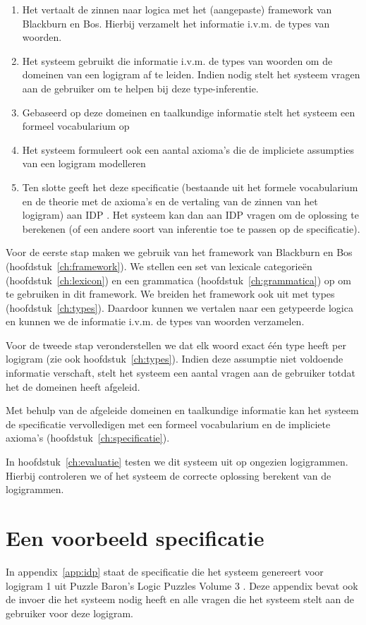 \begin{enumerate}
  \item Het vertaalt de zinnen naar logica met het (aangepaste) framework van Blackburn en Bos. Hierbij verzamelt het informatie i.v.m. de types van woorden.
  \item Het systeem gebruikt die informatie i.v.m. de types van woorden om de domeinen van een logigram af te leiden. Indien nodig stelt het systeem vragen aan de gebruiker om te helpen bij deze type-inferentie.
  \item Gebaseerd op deze domeinen en taalkundige informatie stelt het systeem een formeel vocabularium op
  \item Het systeem formuleert ook een aantal axioma's die de impliciete assumpties van een logigram modelleren
  \item Ten slotte geeft het deze specificatie (bestaande uit het formele vocabularium en de theorie met de axioma's en de vertaling van de zinnen van het logigram) aan IDP \cite{IDP}. Het systeem kan dan aan IDP vragen om de oplossing te berekenen (of een andere soort van inferentie toe te passen op de specificatie).
\end{enumerate}

Voor de eerste stap maken we gebruik van het framework van Blackburn en Bos (hoofdstuk~\ref{ch:framework}). We stellen een set van lexicale categorieën (hoofdstuk~\ref{ch:lexicon}) en een grammatica (hoofdstuk~\ref{ch:grammatica}) op om te gebruiken in dit framework. We breiden het framework ook uit met types (hoofdstuk~\ref{ch:types}). Daardoor kunnen we vertalen naar een getypeerde logica en kunnen we de informatie i.v.m. de types van woorden verzamelen.

Voor de tweede stap veronderstellen we dat elk woord exact één type heeft per logigram (zie ook hoofdstuk~\ref{ch:types}). Indien deze assumptie niet voldoende informatie verschaft, stelt het systeem een aantal vragen aan de gebruiker totdat het de domeinen heeft afgeleid. 

Met behulp van de afgeleide domeinen en taalkundige informatie kan het systeem de specificatie vervolledigen met een formeel vocabularium en de impliciete axioma's (hoofdstuk~\ref{ch:specificatie}).

In hoofdstuk~\ref{ch:evaluatie} testen we dit systeem uit op ongezien logigrammen. Hierbij controleren we of het systeem de correcte oplossing berekent van de logigrammen.

\section{Een voorbeeld specificatie}
In appendix~\ref{app:idp} staat de specificatie die het systeem genereert voor logigram 1 uit Puzzle Baron's Logic Puzzles Volume 3 \cite{logigrammen}. Deze appendix bevat ook de invoer die het systeem nodig heeft en alle vragen die het systeem stelt aan de gebruiker voor deze logigram.

